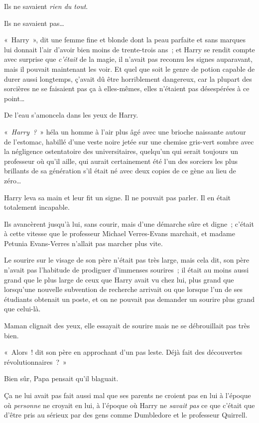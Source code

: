 Ils ne savaient \emph{rien du tout}.

Ils ne savaient pas…

«~Harry~», dit une femme fine et blonde dont la peau parfaite et sans marques lui donnait l'air d'avoir bien moins de trente-trois ans~; et Harry se rendit compte avec surprise que \emph{c'était} de la magie, il n'avait pas reconnu les signes auparavant, mais il pouvait maintenant les voir. Et quel que soit le genre de potion capable de durer aussi longtemps, ç'avait dû être horriblement dangereux, car la plupart des sorcières ne se faisaient pas ça à elles-mêmes, elles n'étaient pas désespérées à ce point…

De l'eau s'amoncela dans les yeux de Harry.

«~\emph{Harry~?}~» héla un homme à l'air plus âgé avec une brioche naissante autour de l'estomac, habillé d'une veste noire jetée sur une chemise gris-vert sombre avec la négligence ostentatoire des universitaires, quelqu'un qui serait toujours un professeur où qu'il aille, qui aurait certainement été l'un des sorciers les plus brillants de sa génération s'il était né avec deux copies de ce gène au lieu de zéro…

Harry leva sa main et leur fit un signe. Il ne pouvait pas parler. Il en était totalement incapable.

Ils avancèrent jusqu'à lui, sans courir, mais d'une démarche sûre et digne~; c'était à cette vitesse que le professeur Michael Verres-Evans marchait, et madame Petunia Evans-Verres n'allait pas marcher plus vite.

Le sourire sur le visage de son père n'était pas très large, mais cela dit, son père n'avait pas l'habitude de prodiguer d'immenses sourires~; il était au moins aussi grand que le plus large de ceux que Harry avait vu chez lui, plus grand que lorsqu'une nouvelle subvention de recherche arrivait ou que lorsque l'un de ses étudiants obtenait un poste, et on ne pouvait pas demander un sourire plus grand que celui-là.

Maman clignait des yeux, elle essayait de sourire mais ne se débrouillait pas très bien.

«~Alors~! dit son père en approchant d'un pas leste. Déjà fait des découvertes révolutionnaires~?~»

Bien sûr, Papa pensait qu'il blaguait.

Ça ne lui avait pas fait aussi mal que ses parents ne croient pas en lui à l'époque où \emph{personne} ne croyait en lui, à l'époque où Harry ne \emph{savait pas} ce que c'était que d'être pris au sérieux par des gens comme Dumbledore et le professeur Quirrell.

